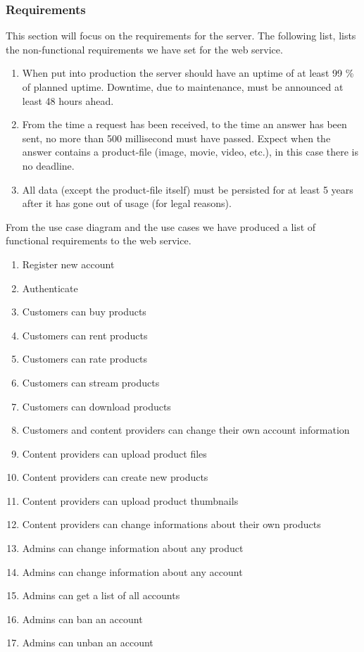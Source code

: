 \subsubsection{Requirements}
\label{s_serviceRequirements}
This section will focus on the requirements for the server. The following list, lists the non-functional requirements we have set for the web service.
\\
\begin{enumerate}[label=NFR-\arabic*]
	\item When put into production the server should have an uptime of at least 99 \% of planned uptime. Downtime, due to maintenance, must be announced at least 48 hours ahead.
	
	\item From the time a request has been received, to the time an answer has been sent, no more than 500 millisecond must have passed. Expect when the answer contains a product-file (image, movie, video, etc.), in this case there is no deadline.
	
	\item All data (except the product-file itself) must be persisted for at least 5 years after it has gone out of usage (for legal reasons).
\end{enumerate}

From the use case diagram and the use cases we have produced a list of functional requirements to the web service.

\begin{enumerate}[label=FR-\arabic*]
	\item Register new account
	\item Authenticate
	\item Customers can buy products
	\item Customers can rent products
	\item Customers can rate products
	\item Customers can stream products
	\item Customers can download products
	\item Customers and content providers can change their own account information
	\item Content providers can upload product files
	\item Content providers can create new products
	\item Content providers can upload product thumbnails
	\item Content providers can change informations about their own products
	\item Admins can change information about any product
	\item Admins can change information about any account
	\item Admins can get a list of all accounts
	\item Admins can ban an account
	\item Admins can unban an account
\end{enumerate}